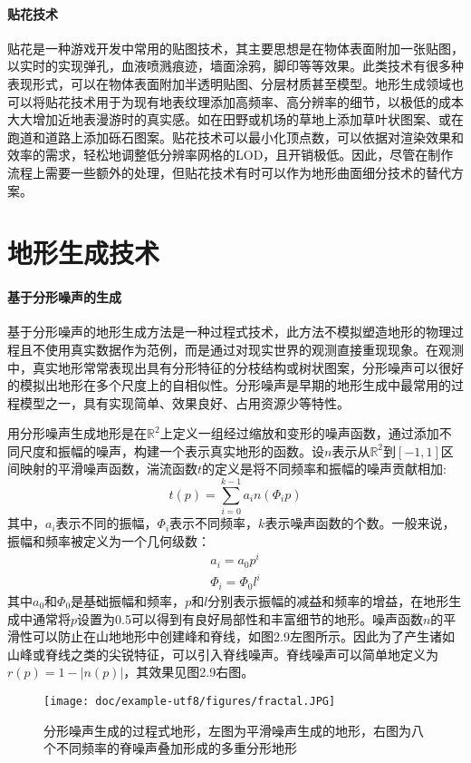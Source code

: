 \paragraph{贴花技术}
贴花是一种游戏开发中常用的贴图技术，其主要思想是在物体表面附加一张贴图，以实时的实现弹孔，血液喷溅痕迹，墙面涂鸦，脚印等等效果。此类技术有很多种表现形式，可以在物体表面附加半透明贴图、分层材质甚至模型。地形生成领域也可以将贴花技术用于为现有地表纹理添加高频率、高分辨率的细节，以极低的成本大大增加近地表漫游时的真实感。如在田野或机场的草地上添加草叶状图案、或在跑道和道路上添加砾石图案。贴花技术可以最小化顶点数，可以依据对渲染效果和效率的需求，轻松地调整低分辨率网格的LOD，且开销极低。因此，尽管在制作流程上需要一些额外的处理，但贴花技术有时可以作为地形曲面细分技术的替代方案。

\section{地形生成技术}
\paragraph{基于分形噪声的生成}
基于分形噪声的地形生成方法是一种过程式技术，此方法不模拟塑造地形的物理过程且不使用真实数据作为范例，而是通过对现实世界的观测直接重现现象。在观测中，真实地形常常表现出具有分形特征的分枝结构或树状图案，分形噪声可以很好的模拟出地形在多个尺度上的自相似性。分形噪声是早期的地形生成中最常用的过程模型之一，具有实现简单、效果良好、占用资源少等特性。\par
用分形噪声生成地形是在$\mathbb{R}^2$上定义一组经过缩放和变形的噪声函数\supercite{fbm}，通过添加不同尺度和振幅的噪声，构建一个表示真实地形的函数。设$n$表示从$\mathbb{R}^2$到$[−1,1]$区间映射的平滑噪声函数，湍流函数$t$的定义是将不同频率和振幅的噪声贡献相加:
\begin{equation}
t(p)=\sum_{i=0}^{k-1}a_in(\Phi_ip)
\end{equation}
其中，$a_i$表示不同的振幅，$\Phi_i$表示不同频率，$k$表示噪声函数的个数。一般来说，振幅和频率被定义为一个几何级数：
\begin{equation}
\begin{aligned}
a_i=a_0p^i \\
\Phi_i=\Phi_0l^i
\end{aligned}
\end{equation}
其中$a_0$和$\Phi_0$是基础振幅和频率，$p$和$l$分别表示振幅的减益和频率的增益，在地形生成中通常将$p$设置为0.5可以得到有良好局部性和丰富细节的地形。噪声函数$n$的平滑性可以防止在山地地形中创建峰和脊线，如图2.9左图所示。因此为了产生诸如山峰或脊线之类的尖锐特征，可以引入脊线噪声。脊线噪声可以简单地定义为$r(p) = 1-|n(p)|$，其效果见图2.9右图。
\begin{figure}[htbp]
\centering
\texttt{[image: doc/example-utf8/figures/fractal.JPG]}
\caption{分形噪声生成的过程式地形，左图为平滑噪声生成的地形，右图为八个不同频率的脊噪声叠加形成的多重分形地形\supercite{eric-review}}
\end{figure}
